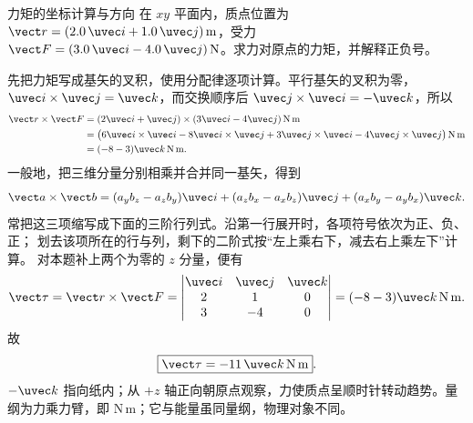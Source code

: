 \begin{center}
\label{ch01:fig:right-hand-rule}
\end{center}

\begin{origexamplebox}{力矩的坐标计算与方向}
在 $xy$ 平面内，质点位置为 $\vect r=(2.0\,\uvec i+1.0\,\uvec j)\,\mathrm m$，受力
$\vect F=(3.0\,\uvec i-4.0\,\uvec j)\,\mathrm N$。求力对原点的力矩，并解释正负号。
\end{origexamplebox}
\begin{xesolution}
先把力矩写成基矢的叉积，使用分配律逐项计算。平行基矢的叉积为零，
$\uvec i\times\uvec j=\uvec k$，而交换顺序后
$\uvec j\times\uvec i=-\uvec k$，所以
\begin{align*}
 \vect r\times\vect F
 &=(2\uvec i+\uvec j)\times(3\uvec i-4\uvec j)\,\mathrm{N\,m}\\
 &=\bigl(6\uvec i\times\uvec i-8\uvec i\times\uvec j
       +3\uvec j\times\uvec i-4\uvec j\times\uvec j\bigr)\,\mathrm{N\,m}\\
 &=(-8-3)\uvec k\,\mathrm{N\,m}.
\end{align*}
一般地，把三维分量分别相乘并合并同一基矢，得到
\[
 \vect a\times\vect b
 =(a_yb_z-a_zb_y)\uvec i+(a_zb_x-a_xb_z)\uvec j
 +(a_xb_y-a_yb_x)\uvec k.
\]
常把这三项缩写成下面的三阶行列式。沿第一行展开时，各项符号依次为正、负、正；
划去该项所在的行与列，剩下的二阶式按“左上乘右下，减去右上乘左下”计算。
对本题补上两个为零的 $z$ 分量，便有
\[
 \vect\tau=\vect r\times\vect F
 =\begin{vmatrix}
 \uvec i&\uvec j&\uvec k\\2&1&0\\3&-4&0
 \end{vmatrix}
 =(-8-3)\uvec k\,\mathrm{N\,m}.
\]
故
\[
 \boxed{\vect\tau=-11\,\uvec k\,\mathrm{N\,m}}.
\]
$-\uvec k$ 指向纸内；从 $+z$ 轴正向朝原点观察，力使质点呈顺时针转动趋势。量纲为力乘力臂，即 $\mathrm{N\,m}$；它与能量虽同量纲，物理对象不同。
\end{xesolution}

